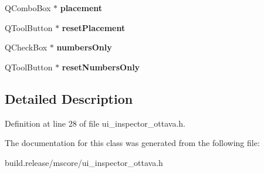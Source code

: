 \begin{DoxyCompactItemize}
Q\+Combo\+Box $\ast$ {\bfseries placement}
\item 
\mbox{\label{class_ui___inspector_ottava_ad6e014f6a17da236627fd366750b6418}} 
Q\+Tool\+Button $\ast$ {\bfseries reset\+Placement}
\item 
\mbox{\label{class_ui___inspector_ottava_abf3f671638e3fd8f04b3cca398b2c4e4}} 
Q\+Check\+Box $\ast$ {\bfseries numbers\+Only}
\item 
\mbox{\label{class_ui___inspector_ottava_ad5f76425be06fea8a31d35267171d9c5}} 
Q\+Tool\+Button $\ast$ {\bfseries reset\+Numbers\+Only}
\end{DoxyCompactItemize}


\subsection{Detailed Description}


Definition at line 28 of file ui\+\_\+inspector\+\_\+ottava.\+h.



The documentation for this class was generated from the following file\+:\begin{DoxyCompactItemize}
\item 
build.\+release/mscore/ui\+\_\+inspector\+\_\+ottava.\+h\end{DoxyCompactItemize}
